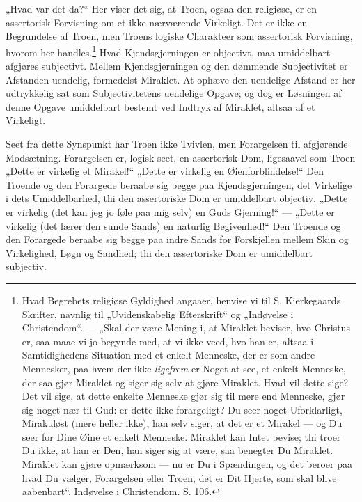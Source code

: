 \documentclass[12pt]{book}
\newcommand{\opage}[1]{\marginnote{\footnotesize\textit{[#1]}}}
\begin{document}
„Hvad var det da?“ Her viser det sig, at Troen, ogsaa
den religiøse, er en assertorisk Forvisning om et ikke nærværende
Virkeligt. Det er ikke en Begrundelse af Troen,
men Troens logiske Charakteer som assertorisk Forvisning,
\opage{209}hvorom her handles.\footnote{Hvad Begrebets religiøse Gyldighed angaaer, henvise vi til S.
Kierkegaards Skrifter, navnlig til „Uvidenskabelig Efterskrift“ og
„Indøvelse i Christendom“. --- „Skal der være Mening i, at
Miraklet beviser, hvo Christus er, saa maae vi jo begynde med, at
vi ikke veed, hvo han er, altsaa i Samtidighedens Situation med
et enkelt Menneske, der er som andre Mennesker, paa hvem der
ikke \emph{ligefrem} er Noget at see, et enkelt Menneske, der saa gjør
Miraklet og siger sig selv at gjøre Miraklet. Hvad vil dette sige?
Det vil sige, at dette enkelte Menneske gjør sig til mere end
Menneske, gjør sig noget nær til Gud: er dette ikke forargeligt?
Du seer noget Uforklarligt, Mirakuløst (mere heller ikke), han selv
siger, at det er et Mirakel --- og Du seer for Dine Øine et enkelt
Menneske. Miraklet kan Intet bevise; thi troer Du ikke, at han er
Den, han siger sig at være, saa benegter Du Miraklet. Miraklet kan
gjøre opmærksom --- nu er Du i Spændingen, og det beroer paa
hvad Du vælger, Forargelsen eller Troen, det er Dit Hjerte, som
skal blive aabenbart“. Indøvelse i Christendom. S. 106.} %
Hvad Kjendsgjerningen er objectivt,
maa umiddelbart afgjøres subjectivt. Mellem Kjendsgjerningen
og den dømmende Subjectivitet er Afstanden uendelig, formedelst
Miraklet. At ophæve den uendelige Afstand er her
udtrykkelig sat som Subjectivitetens uendelige Opgave; og dog
er Løsningen af denne Opgave umiddelbart bestemt ved Indtryk
af Miraklet, altsaa af et Virkeligt.

Seet fra dette Synspunkt har Troen ikke Tvivlen, men
Forargelsen til afgjørende Modsætning. Forargelsen er, logisk
seet, en assertorisk Dom, ligesaavel som Troen „Dette er %
virkelig et Mirakel!“ „Dette er virkelig en Øienforblindelse!“
Den Troende og den Forargede beraabe sig begge paa Kjendsgjerningen,
det Virkelige i dets Umiddelbarhed, thi den assertoriske
Dom er umiddelbart objectiv. „Dette er virkelig (det
kan jeg jo føle paa mig selv) en Guds Gjerning!“ --- „Dette
er virkelig (det lærer den sunde Sands) en naturlig Begivenhed!“
Den Troende og den Forargede beraabe sig begge paa
indre Sands for Forskjellen mellem Skin og Virkelighed,
\opage{210}Løgn og Sandhed; thi den assertoriske Dom er umiddelbart
subjectiv.
\end{document}
